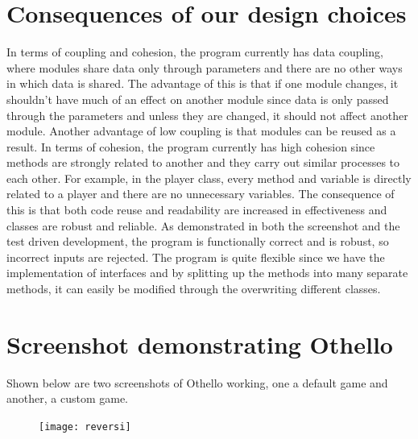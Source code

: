 \documentclass[a4wide, 11pt]{article}
\begin{document}
\section{Consequences of our design choices}
In terms of coupling and cohesion, the program currently has data coupling, where modules share data only through parameters and there are no other ways in which data is shared. The advantage of this is that if one module changes, it shouldn't have much of an effect on another module since data is only passed through the parameters and unless they are changed, it should not affect another module. Another advantage of low coupling is that modules can be reused as a result. In terms of cohesion, the program currently has high cohesion since methods are strongly related to another and they carry out similar processes to each other. For example, in the player class, every method and variable is directly related to a player and there are no unnecessary variables. The consequence of this is that both code reuse and readability are increased in effectiveness and classes are robust and reliable. As demonstrated in both the screenshot and the test driven development, the program is functionally correct and is robust, so incorrect inputs are rejected. The program is quite flexible since we have the implementation of interfaces and by splitting up the methods into many separate methods, it can easily be modified through the overwriting different classes.


\section{Screenshot demonstrating Othello}
Shown below are two screenshots of Othello working, one a default game and another, a custom game.

\begin{figure}
\centering \texttt{[image: reversi]} 
\end{figure}
\end{document}
